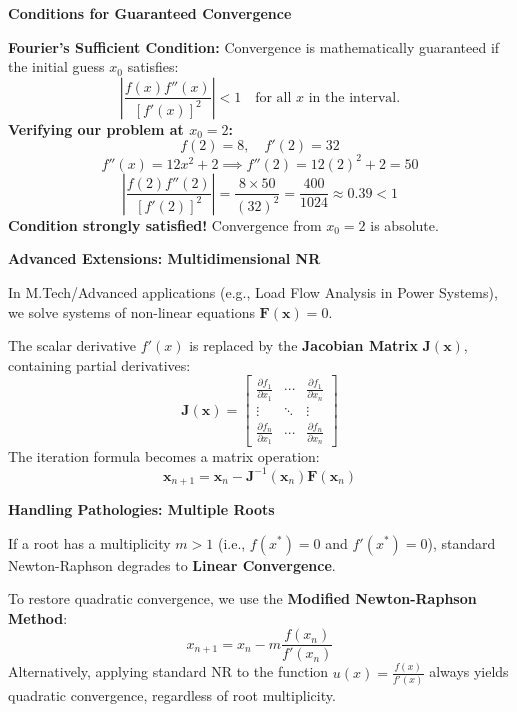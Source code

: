 \documentclass[12pt]{beamer}
\begin{document}
\begin{frame}{\textbf{Conditions for Guaranteed Convergence}}
  \begin{center}
  \vfill
  \textbf{Fourier's Sufficient Condition:} Convergence is mathematically guaranteed if the initial guess $x_0$ satisfies:
  \[
    \left| \frac{f(x) f''(x)}{[f'(x)]^2} \right| < 1 \quad \text{for all } x \text{ in the interval.}
  \]
  \vspace{0.2em}
  \textbf{Verifying our problem at $x_0 = 2$:}
  \[ f(2) = 8, \quad f'(2) = 32 \]
  \[ f''(x) = 12x^2 + 2 \implies f''(2) = 12(2)^2 + 2 = 50 \]
  \[
    \left| \frac{f(2) f''(2)}{[f'(2)]^2} \right| = \frac{8 \times 50}{(32)^2} = \frac{400}{1024} \approx 0.39 < 1
  \]
  \textbf{\textcolor{okgreen}{Condition strongly satisfied!}} Convergence from $x_0=2$ is absolute.
  \vfill
  \end{center}
\end{frame}

\begin{frame}{\textbf{Advanced Extensions: Multidimensional NR}}
  \begin{center}
  \vfill
  In M.Tech/Advanced applications (e.g., Load Flow Analysis in Power Systems), we solve systems of non-linear equations $\mathbf{F}(\mathbf{x}) = 0$.
  \vspace{1em}
  
  The scalar derivative $f'(x)$ is replaced by the \textbf{Jacobian Matrix} $\mathbf{J}(\mathbf{x})$, containing partial derivatives:
  \[
    \mathbf{J}(\mathbf{x}) = \begin{bmatrix}
    \frac{\partial f_1}{\partial x_1} & \cdots & \frac{\partial f_1}{\partial x_n} \\
    \vdots & \ddots & \vdots \\
    \frac{\partial f_n}{\partial x_1} & \cdots & \frac{\partial f_n}{\partial x_n}
    \end{bmatrix}
  \]
  \vspace{1em}
  The iteration formula becomes a matrix operation:
  \[
    \mathbf{x}_{n+1} = \mathbf{x}_n - \mathbf{J}^{-1}(\mathbf{x}_n) \mathbf{F}(\mathbf{x}_n)
  \]
  \vfill
  \end{center}
\end{frame}

\begin{frame}{\textbf{Handling Pathologies: Multiple Roots}}
  \begin{center}
  \vfill
  If a root has a multiplicity $m > 1$ (i.e., $f(x^*) = 0$ and $f'(x^*) = 0$), standard Newton-Raphson degrades to \textbf{Linear Convergence}.
  \vspace{1em}
  
  To restore quadratic convergence, we use the \textbf{Modified Newton-Raphson Method}:
  \[
    x_{n+1} = x_n - m \frac{f(x_n)}{f'(x_n)}
  \]
  \vspace{1em}
  Alternatively, applying standard NR to the function $u(x) = \frac{f(x)}{f'(x)}$ always yields quadratic convergence, regardless of root multiplicity.
  \vfill
  \end{center}
\end{frame}
\end{document}
